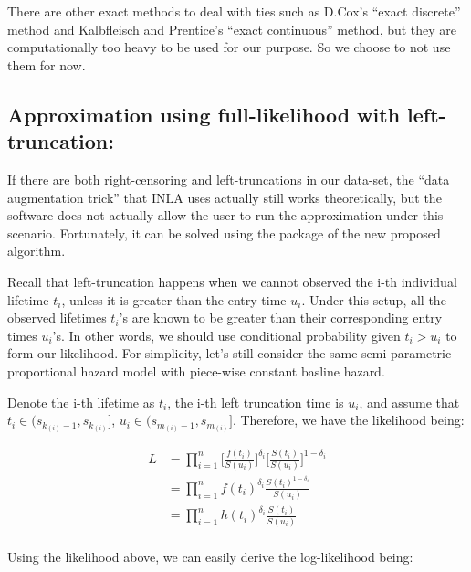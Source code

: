 \documentclass[]{article}
\begin{document}
There are other exact methods to deal with ties such as D.Cox's ``exact
discrete'' method and Kalbfleisch and Prentice's ``exact continuous''
method, but they are computationally too heavy to be used for our
purpose. So we choose to not use them for now.

\hypertarget{approximation-using-full-likelihood-with-left-truncation}{%
\subsection{Approximation using full-likelihood with
left-truncation:}\label{approximation-using-full-likelihood-with-left-truncation}}

If there are both right-censoring and left-truncations in our data-set,
the ``data augmentation trick'' that INLA uses actually still works
theoretically, but the software does not actually allow the user to run
the approximation under this scenario. Fortunately, it can be solved
using the package of the new proposed algorithm.

Recall that left-truncation happens when we cannot observed the i-th
individual lifetime \(t_i\), unless it is greater than the entry time
\(u_i\). Under this setup, all the observed lifetimes \(t_i\)'s are
known to be greater than their corresponding entry times \(u_i\)'s. In
other words, we should use conditional probability given \(t_i > u_i\)
to form our likelihood. For simplicity, let's still consider the same
semi-parametric proportional hazard model with piece-wise constant
basline hazard.

Denote the i-th lifetime as \(t_i\), the i-th left truncation time is
\(u_i\), and assume that \(t_i \in (s_{k_{(i)}-1},s_{k_{(i)}}]\),
\(u_i \in (s_{m_{(i)}-1},s_{m_{(i)}}]\). Therefore, we have the
likelihood being:

\begin{equation}\begin{aligned}\label{eqn:lt}
L &= \prod_{i=1}^{n} {\bigg[\frac{f(t_i)}{S(u_i)}\bigg]^{\delta_i}\bigg[\frac{S(t_i)}{S(u_i)}\bigg]^{1- \delta_i}} \\
  &= \prod_{i=1}^{n} {f(t_i)^{\delta_i}}{\frac{S(t_i)^{1-\delta_i}}{S(u_i)}} \\
  &= \prod_{i=1}^{n} {h(t_i)^{\delta_i}}{\frac{S(t_i)}{S(u_i)}} \\
\end{aligned}\end{equation}

Using the likelihood above, we can easily derive the log-likelihood
being:
\end{document}
